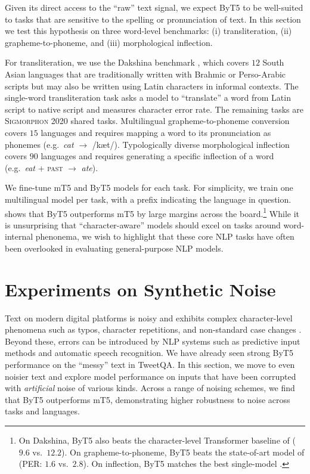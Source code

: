 \documentclass[11pt,a4paper]{article}
\begin{document}
Given its direct access to the ``raw'' text signal, we expect ByT5 to be well-suited to tasks that are sensitive to the spelling or pronunciation of text. In this section we test this hypothesis on three word-level benchmarks: (i) transliteration, (ii) grapheme-to-phoneme, and (iii) morphological inflection.

For transliteration, we use the Dakshina benchmark \cite{roark-etal-2020-processing}, which covers $12$ South Asian languages that are traditionally written with Brahmic or Perso-Arabic scripts but may also be written using Latin characters in informal contexts. The single-word transliteration task asks a model to ``translate'' a word from Latin script to native script and measures character error rate. The remaining tasks are \textsc{Sigmorphon} 2020 shared tasks. Multilingual grapheme-to-phoneme conversion \cite{gorman-etal-2020-sigmorphon} covers $15$ languages and requires mapping a word to its pronunciation as phonemes (e.g.~\textit{cat} $\rightarrow$ /k\ae{}t/). Typologically diverse morphological inflection \cite{vylomova-etal-2020-sigmorphon} covers $90$ languages and requires generating a specific inflection of a word (e.g.~\textit{eat} + \textsc{past} $\rightarrow$ \textit{ate}).

We fine-tune mT5 and ByT5 models for each task. For simplicity, we train one multilingual model per task, with a prefix indicating the language in question.  shows that ByT5 outperforms mT5 by large margins across the board.\footnote{On Dakshina, ByT5 also beats the character-level Transformer baseline of \citet{roark-etal-2020-processing} ($9.6$ vs.~$12.2$). On grapheme-to-phoneme, ByT5 beats the state-of-art model of \citet{yu-etal-2020-ensemble} (PER: $1.6$ vs.~$2.8$). On inflection, ByT5 matches the best single-model \cite{peters-martins-2020-one}.} While it is unsurprising that ``character-aware'' models should excel on tasks around word-internal phenonema, we wish to highlight that these core NLP tasks have often been overlooked in evaluating general-purpose NLP models.

\section{Experiments on Synthetic Noise}
\label{sec:noise}

Text on modern digital platforms is noisy and exhibits complex character-level phenomena such as typos, character repetitions, and non-standard case changes \cite{caswell2020language}. Beyond these, errors can be introduced by NLP systems such as predictive input methods and automatic speech recognition. We have already seen strong ByT5 performance on the ``messy'' text in TweetQA. In this section, we move to even noisier text and explore model performance on inputs that have been corrupted with \emph{artificial} noise of various kinds. Across a range of noising schemes, we find that ByT5 outperforms mT5, demonstrating higher robustness to noise across tasks and languages.
\end{document}
